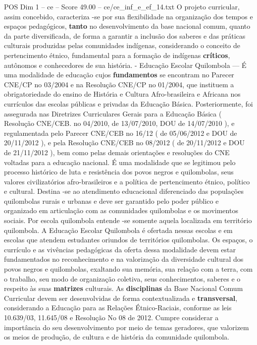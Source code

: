 \begin{textsample}{POS Dim 1 – ce – Score 49.00 – ce/ce\_inf\_e\_ef\_14.txt}
O projeto curricular, assim concebido, caracteriza -se por sua flexibilidade na organização dos tempos e espaços pedagógicos, \textbf{tanto} no desenvolvimento da base nacional comum, quanto da parte diversificada, de forma a garantir a inclusão dos saberes e das práticas culturais produzidas pelas comunidades indígenas, considerando o conceito de pertencimento étnico, fundamental para a formação de indígenas \textbf{críticos}, autônomos e conhecedores de sua história. - Educação Escolar Quilombola — É uma modalidade de educação cujos \textbf{fundamentos} se encontram no Parecer CNE/CP no 03/2004 e na Resolução CNE/CP no 01/2004, que instituem a obrigatoriedade do ensino de História e Cultura Afro-brasileira e Africana nos currículos das escolas públicas e privadas da Educação Básica.
Posteriormente, foi assegurada nas Diretrizes Curriculares Gerais para a Educação Básica ( Resolução CNE/CEB. no 04/2010, de 13/07/2010, DOU de 14/07/2010 ), e regulamentada pelo Parecer CNE/CEB no 16/12 ( de 05/06/2012 e DOU de 20/11/2012 ), e pela Resolução CNE/CEB no 08/2012 ( de 20/11/2012 e DOU de 21/11/2012 ), bem como pelas demais orientações e resoluções do CNE voltadas para a educação nacional.
É uma modalidade que se legitimou pelo processo histórico de luta e resistência dos povos negros e quilombolas, seus valores civilizatórios afro-brasileiros e a política de pertencimento étnico, político e cultural.
Destina -se ao atendimento educacional diferenciado das populações quilombolas rurais e urbanas e deve ser garantido pelo poder público e organizado em articulação com as comunidades quilombolas e os movimentos sociais.
Por escola quilombola entende -se somente aquela localizada em território quilombola.
A Educação Escolar Quilombola é ofertada nessas escolas e em escolas que atendem estudantes oriundos de territórios quilombolas.
Os espaços, o currículo e as vivências pedagógicas da oferta dessa modalidade devem estar fundamentados no reconhecimento e na valorização da diversidade cultural dos povos negros e quilombolas, exaltando sua memória, sua relação com a terra, com o trabalho, seu modo de organização coletiva, seus conhecimentos, saberes e o respeito às suas \textbf{matrizes} culturais.
As \textbf{disciplinas} da Base Nacional Comum Curricular devem ser desenvolvidas de forma contextualizada e \textbf{transversal}, considerando a Educação para as Relações Étnico-Raciais, conforme as leis 10.639/03, 11.645/08 e Resolução No 08 de 2012.
Cumpre considerar a importância do seu desenvolvimento por meio de temas geradores, que valorizem os meios de produção, de cultura e de história da comunidade quilombola.

\end{textsample}
